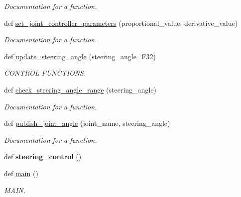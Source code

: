 \begin{DoxyCompactItemize}
\begin{DoxyCompactList}\small\item\em Documentation for a function. \end{DoxyCompactList}\item 
def \mbox{\hyperlink{namespacedoxytest_a3df04af9cb765f57157e4d9c6b892be4}{set\+\_\+joint\+\_\+controller\+\_\+parameters}} (proportional\+\_\+value, derivative\+\_\+value)
\begin{DoxyCompactList}\small\item\em Documentation for a function. \end{DoxyCompactList}\item 
def \mbox{\hyperlink{namespacedoxytest_acd0aa7ea92003151c7287b61bd0adab1}{update\+\_\+steering\+\_\+angle}} (steering\+\_\+angle\+\_\+\+F32)
\begin{DoxyCompactList}\small\item\em C\+O\+N\+T\+R\+OL F\+U\+N\+C\+T\+I\+O\+NS. \end{DoxyCompactList}\item 
def \mbox{\hyperlink{namespacedoxytest_a94c5d66f4c2b1ea971d87139216ee0d8}{check\+\_\+steering\+\_\+angle\+\_\+range}} (steering\+\_\+angle)
\begin{DoxyCompactList}\small\item\em Documentation for a function. \end{DoxyCompactList}\item 
def \mbox{\hyperlink{namespacedoxytest_a001f8664bb3ab1e406bb1db4f367d1fe}{publish\+\_\+joint\+\_\+angle}} (joint\+\_\+name, steering\+\_\+angle)
\begin{DoxyCompactList}\small\item\em Documentation for a function. \end{DoxyCompactList}\item 
\mbox{\label{namespacedoxytest_a132f36e93871f53cfa4343568496d5ce}} 
def {\bfseries steering\+\_\+control} ()
\item 
\mbox{\label{namespacedoxytest_ab5ddfdd38bd0099c6c028d6adff2d9c1}} 
def \mbox{\hyperlink{namespacedoxytest_ab5ddfdd38bd0099c6c028d6adff2d9c1}{main}} ()
\begin{DoxyCompactList}\small\item\em M\+A\+IN. \end{DoxyCompactList}\end{DoxyCompactItemize}
